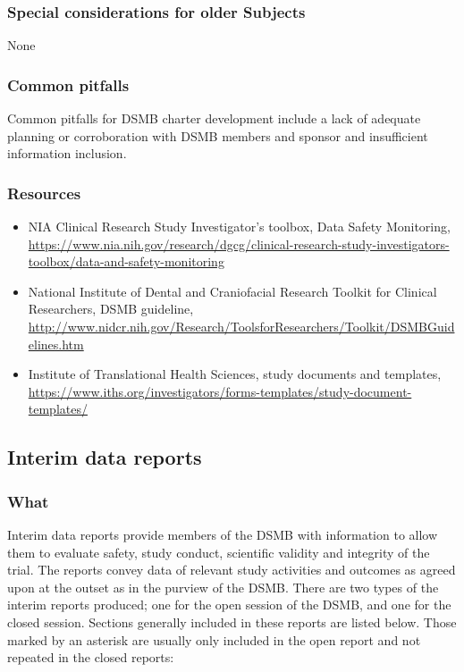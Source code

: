 \documentclass[]{book}
\theoremstyle{definition}
\theoremstyle{definition}
\theoremstyle{definition}
\theoremstyle{remark}
\begin{document}
\subsubsection{Special considerations for older
Subjects}\label{special-considerations-for-older-subjects-9}

None

\subsubsection{Common pitfalls}\label{common-pitfalls-12}

Common pitfalls for DSMB charter development include a lack of adequate
planning or corroboration with DSMB members and sponsor and insufficient
information inclusion.

\subsubsection{Resources}\label{resources-14}

\begin{itemize}
\item
  NIA Clinical Research Study Investigator's toolbox, Data Safety
  Monitoring,
  \url{https://www.nia.nih.gov/research/dgcg/clinical-research-study-investigators-toolbox/data-and-safety-monitoring}
\item
  National Institute of Dental and Craniofacial Research Toolkit for
  Clinical Researchers, DSMB guideline,
  \url{http://www.nidcr.nih.gov/Research/ToolsforResearchers/Toolkit/DSMBGuidelines.htm}
\item
  Institute of Translational Health Sciences, study documents and
  templates,
  \url{https://www.iths.org/investigators/forms-templates/study-document-templates/}
\end{itemize}

\subsection{Interim data reports}\label{interim-data-reports}

\subsubsection{What}\label{what-15}

Interim data reports provide members of the DSMB with information to
allow them to evaluate safety, study conduct, scientific validity and
integrity of the trial. The reports convey data of relevant study
activities and outcomes as agreed upon at the outset as in the purview
of the DSMB. There are two types of the interim reports produced; one
for the open session of the DSMB, and one for the closed session.
Sections generally included in these reports are listed below. Those
marked by an asterisk are usually only included in the open report and
not repeated in the closed reports:
\end{document}
